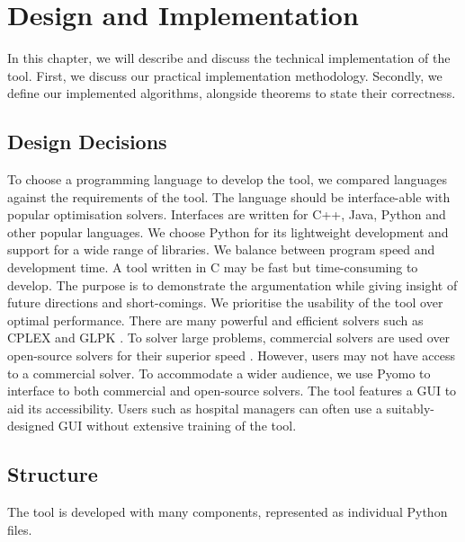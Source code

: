 \chapter{Design and Implementation}
\label{implementation}

In this chapter, we will describe and discuss the technical implementation of the tool. First, we discuss our practical implementation methodology. Secondly, we define our implemented algorithms, alongside theorems to state their correctness.

\section{Design Decisions}

To choose a programming language to develop the tool, we compared languages against the requirements of the tool. The language should be interface-able with popular optimisation solvers. Interfaces are written for C++, Java, Python and other popular languages. We choose Python for its lightweight development and support for a wide range of libraries.
\linespace
We balance between program speed and development time. A tool written in C may be fast but time-consuming to develop. The purpose is to demonstrate the argumentation while giving insight of future directions and short-comings. We prioritise the usability of the tool over optimal performance.
\linespace
There are many powerful and efficient solvers such as CPLEX \cite{cplex} and GLPK \cite{glpk}. To solver large problems, commercial solvers are used over open-source solvers for their superior speed \cite{clp}. However, users may not have access to a commercial solver. To accommodate a wider audience, we use Pyomo to interface to both commercial and open-source solvers.
\linespace
The tool features a GUI to aid its accessibility. Users such as hospital managers can often use a suitably-designed GUI without extensive training of the tool.

\section{Structure}
 
The tool is developed with many components, represented as individual Python files. 

